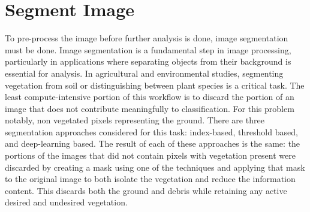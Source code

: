 \documentclass[letterpaper]{report}
\begin{document}
%
%
\section{Segment Image}
\label{section:segmentation}
To pre-process the image before further analysis is done, image segmentation must be done.  Image segmentation is a fundamental step in image processing, particularly in applications where separating objects from their background is essential for analysis. In agricultural and environmental studies, segmenting vegetation from soil or distinguishing between plant species is a critical task. The least compute-intensive portion of this workflow is to discard the portion of an image that does not contribute meaningfully to classification. For this problem notably, non vegetated pixels representing the ground. There are three segmentation approaches considered for this task: index-based, threshold based, and deep-learning based. The result of each of these approaches is the same: the portions of the images that did not contain pixels with vegetation present were discarded by creating a mask using one of the techniques and applying that mask to the original image to both isolate the vegetation and reduce the information content. This discards both the ground and debris while retaining any active desired and undesired vegetation. 
\end{document}
